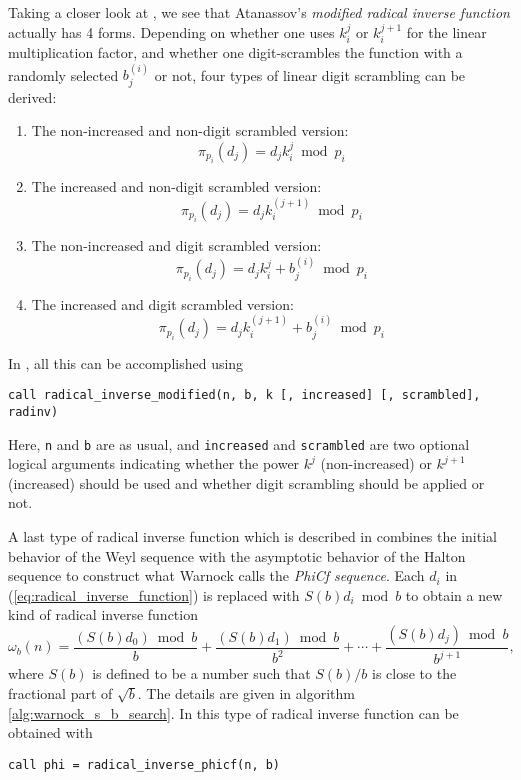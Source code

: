 Taking a closer look at \cite{atanassov04}, we see that Atanassov's
\emph{modified radical inverse function} actually has 4 forms.  Depending on
whether one
uses $k_i^{j}$ or $k_i^{j+1}$ for the linear multiplication factor, and whether
one digit-scrambles the function with a randomly selected $b_j^{(i)}$ or not,
four types of linear digit scrambling can be derived:
\begin{enumerate}
\item The non-increased and non-digit scrambled version:
\begin{equation}
\pi_{p_i}(d_j) = d_jk_i^j \bmod p_i \label{eq:ni_ns}
\end{equation}
%
\item The increased and non-digit scrambled version:
\begin{equation}
\pi_{p_i}(d_j) = d_jk_i^{(j+1)} \bmod p_i \label{eq:i_ns}
\end{equation}
%
\item The non-increased and digit scrambled version:
\begin{equation}
\pi_{p_i}(d_j) = d_jk_i^j + b_j^{(i)} \bmod p_i \label{eq:ni_s}
\end{equation}
%
\item The increased and digit scrambled version:
\begin{equation}
\pi_{p_i}(d_j) = d_jk_i^{(j+1)} + b_j^{(i)} \bmod p_i \label{eq:i_s}
\end{equation}
\end{enumerate}
In \qmcpack{}, all this can be accomplished using
\begin{lstlisting}
call radical_inverse_modified(n, b, k [, increased] [, scrambled], radinv)
\end{lstlisting}
Here, \verb!n! and \verb!b! are as usual, and \verb!increased! and
\verb!scrambled! are two optional logical arguments indicating whether
the power $k^j$ (non-increased) or $k^{j+1}$ (increased) should be used and
whether digit scrambling should be applied or not.

A last type of radical inverse function which is described in
\cite{warnock95} combines the initial behavior of the Weyl sequence
\cite{weyl16} with the asymptotic behavior of the Halton sequence to construct
what Warnock calls the \emph{PhiCf sequence}.  Each $d_i$ in
(\ref{eq:radical_inverse_function}) is replaced with $S(b)d_i \bmod{b}$ to obtain a new kind
of radical inverse function
\[
\omega_b(n) = \frac{(S(b)d_0) \bmod b}{b} + \frac{(S(b)d_1) \bmod b}{b^2} + \cdots + \frac{(S(b)d_j) \bmod b}{b^{j+1}},
\]
where $S(b)$ is defined to be a number such that $S(b)/b$ is close to the
fractional part of $\sqrt{b}$.  The details are given in algorithm
\ref{alg:warnock_s_b_search}.  In \qmcpack{} this type of radical inverse function can be obtained with
\begin{lstlisting}
call phi = radical_inverse_phicf(n, b)
\end{lstlisting}

